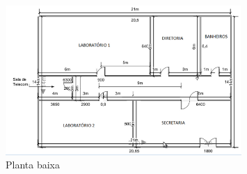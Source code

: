 \documentclass[	DIV=calc,%
							paper=a4,%
							fontsize=12pt,%
							onecolumn]{scrartcl}	 					%
\begin{document}
{\begin{figure}[H]
	\centering
	\includegraphics[width=0.8\textwidth]{fig1}
	\caption{Planta baixa}
	\label{fig1}
\end{figure}}

\end{document}
